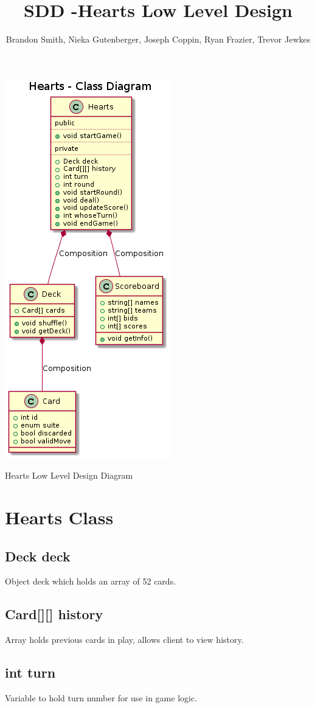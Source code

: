 \documentclass[]{scrartcl}
\title{SDD -Hearts Low Level Design}
\author{Brandon Smith, Nieka Gutenberger, Joseph Coppin, Ryan Frazier, Trevor Jewkes}
\begin{document}
\maketitle

\centerline{\includegraphics{Hearts_Class_diagram.png}}
\centerline{Hearts Low Level Design Diagram}

\section{Hearts Class}

\subsection{Deck deck}
	Object deck which holds an array of 52 cards.
\subsection{Card[][] history}
	Array holds previous cards in play, allows client to view history.
\subsection{int turn}
	Variable to hold turn number for use in game logic.
\end{document}
